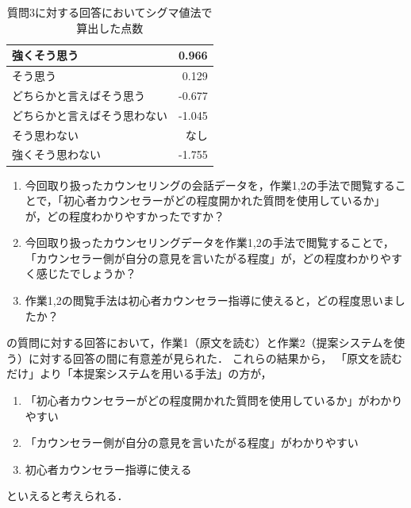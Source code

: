 \documentclass[shuuron]{kuee}
\begin{document}
\begin{table}
  \caption{質問3に対する回答においてシグマ値法で算出した点数}
  \label{table:sigma2}
  \begin{center}
    \begin{tabular}{|l|r|} \hline
      強くそう思う & 0.966 \\ \hline
      そう思う  & 0.129 \\ \hline
      どちらかと言えばそう思う & -0.677 \\ \hline
      どちらかと言えばそう思わない & -1.045 \\ \hline
      そう思わない  & なし \\ \hline
      強くそう思わない & -1.755 \\ \hline
    \end{tabular}
  \end{center}
\end{table}


\begin{enumerate}

  \item 今回取り扱ったカウンセリングの会話データを，作業1,2の手法で閲覧することで，「初心者カウンセラーがどの程度開かれた質問を使用しているか」が，どの程度わかりやすかったですか？
  \item 今回取り扱ったカウンセリングデータを作業1,2の手法で閲覧することで，「カウンセラー側が自分の意見を言いたがる程度」が，どの程度わかりやすく感じたでしょうか？
  \item 作業1,2の閲覧手法は初心者カウンセラー指導に使えると，どの程度思いましたか？
\end{enumerate}

の質問に対する回答において，作業1（原文を読む）と作業2（提案システムを使う）に対する回答の間に有意差が見られた．
これらの結果から，
「原文を読むだけ」より「本提案システムを用いる手法」の方が，
\begin{enumerate}

  \item 「初心者カウンセラーがどの程度開かれた質問を使用しているか」がわかりやすい
  \item 「カウンセラー側が自分の意見を言いたがる程度」がわかりやすい
  \item 初心者カウンセラー指導に使える
\end{enumerate}
といえると考えられる．


\end{document}
